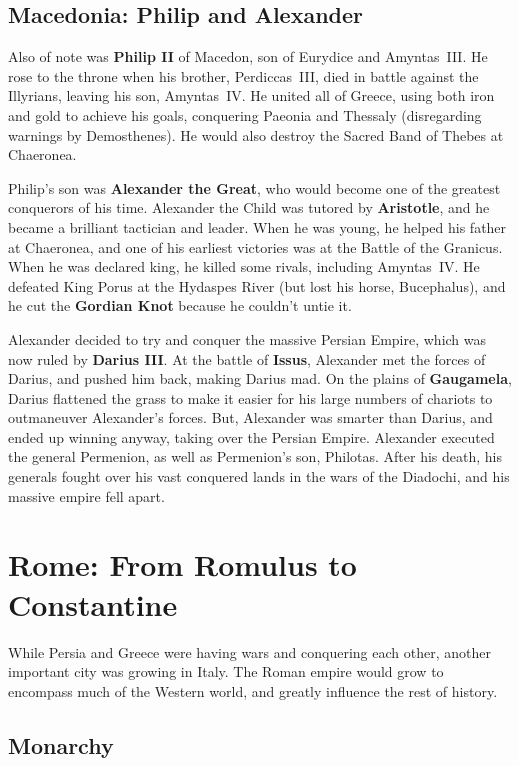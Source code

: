 \subsection*{Macedonia: Philip and Alexander}

Also of note was \textbf{Philip II} of Macedon, son of Eurydice and Amyntas~III\@.
He rose to the throne when his brother, Perdiccas~III,
died in battle against the Illyrians, leaving his son, Amyntas~IV\@.
He united all of Greece, using both iron and gold to achieve his goals,
conquering Paeonia and Thessaly (disregarding warnings by Demosthenes).
He would also destroy the Sacred Band of Thebes at Chaeronea.

Philip's son was \textbf{Alexander the Great}, who would become one of the greatest conquerors of his time.
Alexander the Child was tutored by \textbf{Aristotle}, and he became a brilliant tactician and leader.
When he was young, he helped his father at Chaeronea,
and one of his earliest victories was at the Battle of the Granicus.
When he was declared king, he killed some rivals, including Amyntas~IV\@.
He defeated King Porus at the Hydaspes River (but lost his horse, Bucephalus),
and he cut the \textbf{Gordian Knot} because he couldn't untie it.

Alexander decided to try and conquer the massive Persian Empire, which was now ruled by \textbf{Darius III}\@.
At the battle of \textbf{Issus}, Alexander met the forces of Darius, and pushed him back, making Darius mad.
On the plains of \textbf{Gaugamela},
Darius flattened the grass to make it easier for his large numbers of chariots to outmaneuver Alexander's forces.
But, Alexander was smarter than Darius, and ended up winning anyway, taking over the Persian Empire.
Alexander executed the general Permenion, as well as Permenion's son, Philotas.
After his death, his generals fought over his vast conquered lands in the wars of the Diadochi,
and his massive empire fell apart.

\section{Rome: From Romulus to Constantine}

While Persia and Greece were having wars and conquering each other, another important city was growing in Italy.
The Roman empire would grow to encompass much of the Western world,
and greatly influence the rest of history.

\subsection*{Monarchy}

